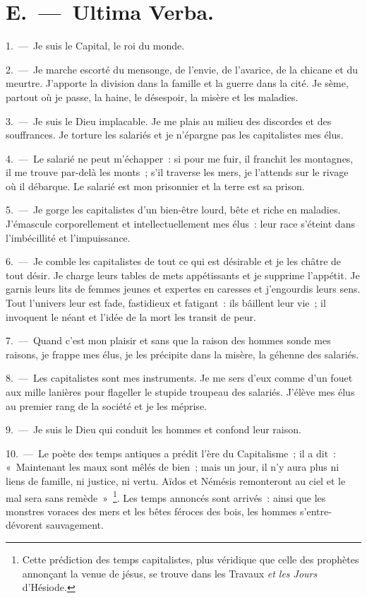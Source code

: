 \documentclass[french,twoside]{book} %
\begin{document}
\section[{E. — Ultima Verba.}]{E. — Ultima Verba.}
1. — Je suis le Capital, le roi du monde.\par
2. — Je marche escorté du mensonge, de l’envie, de l’avarice, de la chicane et du meurtre. J'apporte la division dans la famille et la guerre dans la cité. Je sème, partout où je passe, la haine, le désespoir, la misère et les maladies.\par
3. — Je suis le Dieu implacable. Je me plais au milieu des discordes et des souffrances. Je torture les salariés et je n’épargne pas les capitalistes mes élus.\par
4. — Le salarié ne peut m’échapper : si pour me fuir, il franchit les montagnes, il me trouve par-delà les monts ; s’il traverse les mers, je l’attends sur le rivage où il débarque. Le salarié est mon prisonnier et la terre est sa prison.\par
5. — Je gorge les capitalistes d’un bien-être lourd, bête et riche en maladies. J'émascule corporellement et intellectuellement mes élus : leur race s’éteint dans l’imbécillité et l’impuissance.\par
6. — Je comble les capitalistes de tout ce qui est désirable et je les châtre de tout désir. Je charge leurs tables de mets appétissants et je supprime l’appétit. Je garnis leurs lits de femmes jeunes et expertes en caresses et j’engourdis leurs sens. Tout l’univers leur est fade, fastidieux et fatigant : ils bâillent leur vie ; il invoquent le néant et l’idée de la mort les transit de peur.\par
7. — Quand c’est mon plaisir et sans que la raison des hommes sonde mes raisons, je frappe mes élus, je les précipite dans la misère, la géhenne des salariés.\par
8. — Les capitalistes sont mes instruments. Je me sers d’eux comme d’un fouet aux mille lanières pour flageller le stupide troupeau des salariés. J'élève mes élus au premier rang de la société et je les méprise.\par
9. — Je suis le Dieu qui conduit les hommes et confond leur raison.\par
10. — Le poète des temps antiques a prédit l’ère du Capitalisme ; il a dit : « Maintenant les maux sont mêlés de bien ; mais un jour, il n’y aura plus ni liens de famille, ni justice, ni vertu. Aïdos et Némésis remonteront au ciel et le mal sera sans remède » \footnote{Cette prédiction des temps capitalistes, plus véridique que celle des prophètes annonçant la venue de jésus, se trouve dans les Travaux \emph{et les Jours} d’Hésiode.}. Les temps annoncés sont arrivés : ainsi que les monstres voraces des mers et les bêtes féroces des bois, les hommes s’entre-dévorent sauvagement.\par
\end{document}
